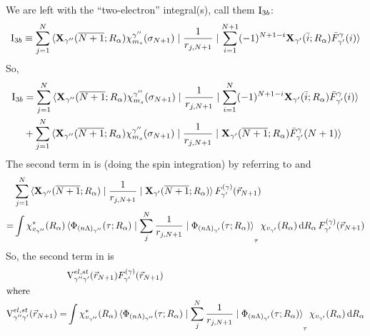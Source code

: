 \documentclass[aps,pra,groupedaddress,12pt,
               amsfonts,amssymb,
               preprint
    ]{revtex4}
\begin{document}
\begin{enumerate}
We are left with the ``two-electron'' integral(s), call them $\mathrm{I}_{3b}$:
\begin{equation}
  \label{eq:intg3c}
  \mathrm{I}_{3b}\equiv\sum_{j=1}^N
        \mathinner{\langle{{\mathbf{X}_{\gamma''}(\overline{N+1};R_\alpha)\chi_{m_s}^{\gamma''}(\sigma_{N+1})} \mid {\dfrac{1}{r_{j,N+1}}} \mid {\sum_{i=1}^{N+1}(-1)^{N+1-i}\mathbf{X}_{\gamma'}(\bar{i};R_\alpha)\bar{F}_{\gamma'}^{\gamma}(i)}}\rangle}
\end{equation}
So,
\begin{equation}
  \label{eq:intg3d}
  \begin{split}
    \mathrm{I}_{3b} &= \sum_{j=1}^N\mathinner{\langle{{\mathbf{X}_{\gamma''}(\overline{N+1};R_\alpha)\chi_{m_s}^{\gamma''}(\sigma_{N+1})} \mid {\dfrac{1}{r_{j,N+1}}} \mid {\sum_{i=1}^N(-1)^{N+1-i}\mathbf{X}_{\gamma'}(\bar{i};R_\alpha)\bar{F}_{\gamma'}^{\gamma}(i)}}\rangle} \\
           &+ \sum_{j=1}^N\mathinner{\langle{{\mathbf{X}_{\gamma''}(\overline{N+1};R_\alpha)\chi_{m_s}^{\gamma''}(\sigma_{N+1})} \mid {\dfrac{1}{r_{j,N+1}}} \mid {\mathbf{X}_{\gamma'}(\overline{N+1};R_\alpha)\bar{F}_{\gamma'}^{\gamma}(N+1)}}\rangle} 
  \end{split}
\end{equation}
The second term in  is (doing the spin integration) by
referring to  and 
\begin{equation}
  \label{eq:intg3e}
  \begin{split}
    &\sum_{j=1}^N\mathinner{\langle{{\mathbf{X}_{\gamma''}(\overline{N+1};R_\alpha)} \mid {\dfrac{1}{r_{j,N+1}}} \mid {\mathbf{X}_{\gamma'}(\overline{N+1};R_\alpha)}}\rangle}F_{\gamma'}^{(\gamma)}(\vec{r}_{N+1})   \\
   =&\int\chi_{v_{\gamma''}}^*(R_\alpha)
     \mathinner{\langle{{\Phi_{(n\Lambda)_{\gamma''}}(\tau;R_\alpha)} \mid {\sum_j^N\dfrac{1}{r_{j,N+1}}} \mid {\Phi_{(n\Lambda)_{\gamma'}}(\tau;R_\alpha)}}\rangle}_\tau
         \chi_{v_{\gamma'}}(R_\alpha)\,\mathrm{d}R_\alpha\,F_{\gamma'}^{(\gamma)}(\vec{r}_{N+1})
  \end{split}
\end{equation}
So, the second term in  is
\begin{subequations}
  \begin{align}
  \label{eq:intg3f}
  &\mathrm{V}_{\gamma''\gamma'}^{el,st}(\vec{r}_{N+1})F_{\gamma'}^{(\gamma)}(\vec{r}_{N+1}) \\
  \intertext{where}
  \mathrm{V}_{\gamma''\gamma'}^{el,st}(\vec{r}_{N+1}) = &\int\chi_{v_{\gamma''}}^*(R_\alpha)
     \mathinner{\langle{{\Phi_{(n\Lambda)_{\gamma''}}(\tau;R_\alpha)} \mid {\sum_j^N\dfrac{1}{r_{j,N+1}}} \mid {\Phi_{(n\Lambda)_{\gamma'}}(\tau;R_\alpha)}}\rangle}_\tau
         \chi_{v_{\gamma'}}(R_\alpha)\,\mathrm{d}R_\alpha
  \end{align}
\end{subequations}


\end{enumerate}
\end{document}

